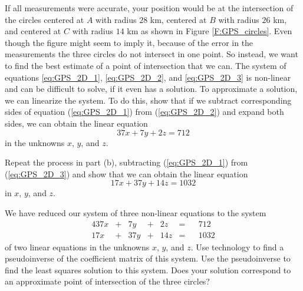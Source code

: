 \begin{pactivity}
\item If all measurements were accurate, your position would be at the intersection of the circles centered at $A$ with radius $28$ km, centered at $B$ with radius $26$ km, and centered at $C$ with radius $14$ km as shown in Figure \ref{F:GPS_circles}. Even though the figure might seem to imply it, because of the error in the measurements the three circles do not intersect in one point. So instead, we want to find the best estimate of a point of intersection that we can. The system of equations \ref{eq:GPS_2D_1}, \ref{eq:GPS_2D_2}, and \ref{eq:GPS_2D_3} is non-linear and can be difficult to solve, if it even has a solution. To approximate a solution, we can linearize the system. To do this, show that if we subtract corresponding sides of equation  (\ref{eq:GPS_2D_1}) from (\ref{eq:GPS_2D_2}) and expand both sides, we can obtain the linear equation
\[37x + 7y + 2z = 712\]
in the unknowns $x$, $y$, and $z$. 

\item Repeat the process in part (b), subtracting (\ref{eq:GPS_2D_1}) from (\ref{eq:GPS_2D_3}) and show that we can obtain the linear equation
\[17x + 37y + 14z = 1032\]
in $x$, $y$, and $z$.

\item We have reduced our system of three non-linear equations to the system
\begin{alignat*}{4}
{37}x 	&{}+{} 	&{7}y 	&{}+{}	&{2}z 	&= &{} 	&712\\
{17}x		&{}+{} 	&{37}y 	&{}+{} 	&{14}z	&= &{}	&1032
\end{alignat*} 
of two linear equations in the unknowns $x$, $y$, and $z$. Use technology to find a pseudoinverse of the coefficient matrix of this system. Use the pseudoinverse to find the least squares solution to this system. Does your solution correspond to an approximate point of intersection of the three circles? 

\ea

\end{pactivity}

